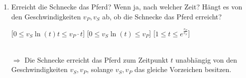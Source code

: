 \documentclass{HM}
\begin{document}
\begin{enumerate}
\begin{enumerate}
			\item Erreicht die Schnecke das Pferd? Wenn ja, nach welcher Zeit? Hängt es von den Geschwindigkeiten $v_P, v_S$ ab, ob die Schnecke das Pferd erreicht?
			\begin{eqnn}
				[$ 0\leq v_S\ln(t)t \leq v_P\cdot t$]
				[$ 0\leq v_S\ln(t) \leq v_P$]
				[$ 1\leq t \leq e^{\frac{v_P}{v_S}}$]
			\end{eqnn}\\
			$\Rightarrow$ Die Schnecke erreicht das Pferd zum Zeitpunkt $t$ unabhängig von den Geschwindigkeiten $v_S, v_P$, solange $v_S, v_P$ das gleiche Vorzeichen besitzen.
		\end{enumerate}
	\end{enumerate}
\end{document}

